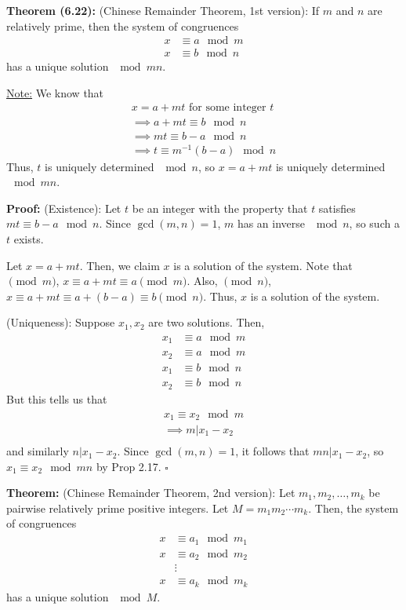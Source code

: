 \documentclass{article}
\newcommand*{\qed}{\hfill$\square$}%
\begin{document}
\textbf{Theorem (6.22):} (Chinese Remainder Theorem, 1st version): If $m$ and $n$ are relatively prime, then the system of congruences \begin{align*}
    x&\equiv a\mod m\\
    x&\equiv b\mod n
\end{align*}has a unique solution $\mod mn$.

\underline{Note:} We know that \begin{align*}
    x=a+mt \text{ for some integer } t\\
    \implies a+mt\equiv b\mod n\\
    \implies mt\equiv b-a\mod n\\
    \implies t\equiv m^{-1}(b-a)\mod n
\end{align*}Thus, $t$ is uniquely determined $\mod n$, so $x=a+mt$ is uniquely determined $\mod mn$.

\textbf{Proof:} (Existence): Let $t$ be an integer with the property that $t$ satisfies $mt\equiv b-a\mod n$. Since $\gcd(m,n)=1$, $m$ has an inverse $\mod n$, so such a $t$ exists. 

Let $x=a+mt$. Then, we claim $x$ is a solution of the system. Note that $\pmod m$, $x\equiv a+mt\equiv a\pmod m$. Also, $\pmod n$, $x\equiv a+mt\equiv a+(b-a)\equiv b\pmod n$. Thus, $x$ is a solution of the system.

(Uniqueness): Suppose $x_1,x_2$ are two solutions. Then, \begin{align*}
    x_1&\equiv a\mod m\\
    x_2&\equiv a\mod m\\
    x_1&\equiv b\mod n\\
    x_2&\equiv b\mod n
\end{align*}But this tells us that \begin{align*}
    x_1\equiv x_2\mod m\\
    \implies m|x_1-x_2\\
\end{align*}and similarly $n|x_1-x_2$. Since $\gcd(m,n)=1$, it follows that $mn|x_1-x_2$, so $x_1\equiv x_2\mod mn$ by Prop 2.17. \qed

\textbf{Theorem:} (Chinese Remainder Theorem, 2nd version): Let $m_1,m_2,\dots, m_k$ be pairwise relatively prime positive integers. Let $M=m_1m_2\cdots m_k$. Then, the system of congruences \begin{align*}
    x&\equiv a_1\mod m_1\\
    x&\equiv a_2\mod m_2\\
    &\vdots\\
    x&\equiv a_k\mod m_k
\end{align*}has a unique solution $\mod M$.
\end{document}
